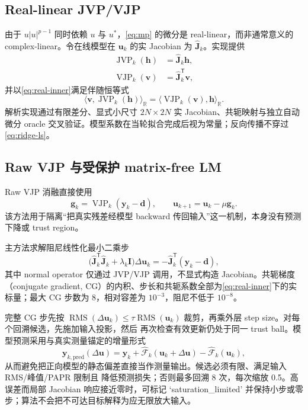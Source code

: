 \documentclass[UTF8,zihao=-4,a4paper]{ctexart}
\begin{document}
\subsection{Real-linear JVP/VJP}

由于 $u|u|^{p-1}$ 同时依赖 $u$ 与 $u^*$，\cref{eq:mp} 的微分是 real-linear，而非通常意义的
complex-linear。令在线模型在 $\bm u_k$ 的实 Jacobian 为 $\widehat{\bm J}_k$。实现提供
\begin{align}
  \operatorname{JVP}_k(\bm h)&=\widehat{\bm J}_k\bm h,\\
  \operatorname{VJP}_k(\bm v)&=\widehat{\bm J}_k^{\mathsf T}\bm v,
\end{align}
并以\cref{eq:real-inner}满足伴随恒等式
\begin{equation}
  \langle \bm v,\operatorname{JVP}_k(\bm h)\rangle_{\mathbb R}
  =\langle \operatorname{VJP}_k(\bm v),\bm h\rangle_{\mathbb R}.
  \label{eq:adjoint}
\end{equation}
解析实现通过有限差分、显式小尺寸 $2N\times2N$ 实 Jacobian、共轭映射与独立自动微分 oracle
交叉验证。模型系数在当轮拟合完成后视为常量；反向传播不穿过\cref{eq:ridge-ls}。

\subsection{Raw VJP 与受保护 matrix-free LM}

Raw VJP 消融直接使用
\begin{equation}
  \bm g_k=\operatorname{VJP}_k(\bm y_k-\bm d),\qquad
  \bm u_{k+1}=\bm u_k-\mu\bm g_k .
  \label{eq:raw-vjp}
\end{equation}
该方法用于隔离“把真实残差经模型 backward 传回输入”这一机制，本身没有预测下降或 trust region。

主方法求解阻尼线性化最小二乘步
\begin{equation}
  \bigl(\widehat{\bm J}_k^{\mathsf T}\widehat{\bm J}_k+\lambda_k\bm I\bigr)
  \Delta\bm u_k=-\widehat{\bm J}_k^{\mathsf T}(\bm y_k-\bm d),
  \label{eq:lm}
\end{equation}
其中 normal operator 仅通过 JVP/VJP 调用，不显式构造 Jacobian。共轭梯度（conjugate gradient,
CG）的内积、步长和共轭系数全部为\cref{eq:real-inner}下的实标量；最大 CG 步数为 8，相对容差为
$10^{-3}$，阻尼不低于 $10^{-8}$。

完整 CG 步先按 $\operatorname{RMS}(\Delta\bm u_k)\leq
\tau\operatorname{RMS}(\bm u_k)$ 裁剪，再乘外层 step size。对每个回溯候选，先施加输入投影，然后
再次检查有效更新仍处于同一 trust ball。模型预测采用与真实测量锚定的增量形式
\begin{equation}
  \bm y_{k,\mathrm{pred}}(\Delta\bm u)
  =\bm y_k+\widehat{\mathcal F}_k(\bm u_k+\Delta\bm u)
  -\widehat{\mathcal F}_k(\bm u_k),
  \label{eq:anchored}
\end{equation}
从而避免把正向模型的静态偏差直接当作测量输出。候选必须有限、满足输入 RMS/峰值/PAPR 限制且
降低预测损失；否则最多回溯 8 次，每次缩放 0.5。高误差而局部 Jacobian 响应接近零时，可标记
`saturation\_limited' 并保持小步或零步；算法不会把不可达目标解释为应无限放大输入。
\end{document}
